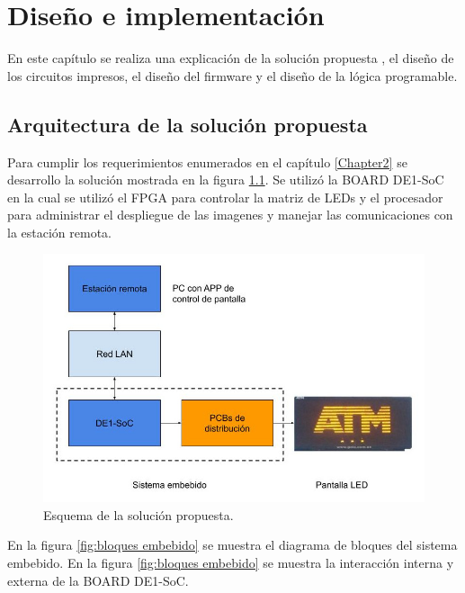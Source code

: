 \chapter{Diseño e implementación} %

\label{Chapter3} 
En este capítulo se realiza una explicación de la solución propuesta , el diseño de los circuitos impresos, el diseño del firmware y el diseño de la lógica programable.

\section{ Arquitectura de la solución propuesta}
Para cumplir los requerimientos enumerados en el capítulo \ref{Chapter2} se desarrollo la solución mostrada en la figura \ref{fig:solución}. Se utilizó la BOARD DE1-SoC en la cual se utilizó el FPGA para controlar la matriz de LEDs y el procesador para administrar el despliegue de las imagenes y manejar las comunicaciones con la estación remota.
\begin{figure}[htpb]
	\centering
	\includegraphics[scale=2]{Figures/Diagramasistemavms.jpg} 
	\caption{Esquema de la solución propuesta.}
	\label{fig:solución}
\end{figure}

En la figura \ref{fig:bloques embebido} se muestra el diagrama de bloques del sistema embebido. En la figura \ref{fig:bloques embebido} se muestra la interacción interna y externa de la BOARD DE1-SoC.
 
